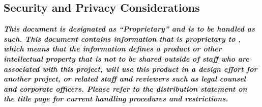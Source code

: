 
\subsection{Security and Privacy Considerations}

{\bf \em This document is designated as ``\OurCorporateName Proprietary'' and is to be handled as such.
This document contains information that is proprietary to \OurCorporateName, which means that the information defines a product or other intellectual property that is not to be shared outside of \OurCorporateName staff who are associated with this project, will use this product in a design effort for another project, or related staff and reviewers such as legal counsel and corporate officers.
Please refer to the distribution statement on the title page for current handling procedures and restrictions.}